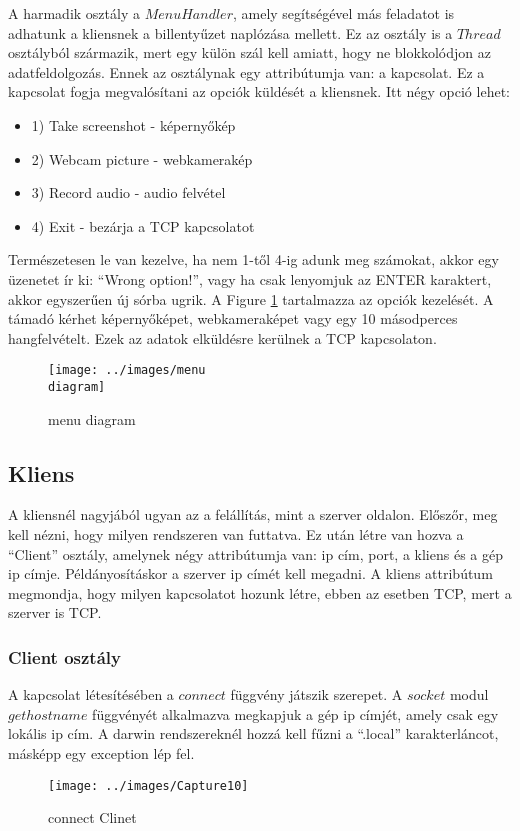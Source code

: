 \documentclass[a4paper, 11pt]{article}
\begin{document}
A harmadik osztály a $MenuHandler$, amely segítségével más feladatot is adhatunk a kliensnek a billentyűzet naplózása mellett. Ez az osztály is a $Thread$ osztályból származik, mert egy külön szál kell amiatt, hogy ne blokkolódjon az adatfeldolgozás. Ennek az osztálynak egy attribútumja van: a kapcsolat. Ez a kapcsolat fogja megvalósítani az opciók küldését a kliensnek. Itt négy opció lehet:
\begin{itemize}
\item 1) Take screenshot - képernyőkép
\item 2) Webcam picture - webkamerakép
\item 3) Record audio - audio felvétel
\item 4) Exit - bezárja a TCP kapcsolatot
\end{itemize}
Természetesen le van kezelve, ha nem 1-től 4-ig adunk meg számokat, akkor egy üzenetet ír ki: ``Wrong option!'', vagy ha csak lenyomjuk az ENTER karaktert, akkor egyszerűen új sórba ugrik. A Figure \ref{fig:menudia} tartalmazza az opciók kezelését. A támadó kérhet képernyőképet, webkameraképet vagy egy 10  másodperces hangfelvételt. Ezek az adatok elküldésre kerülnek a TCP kapcsolaton.
\begin{figure}[H]
\centering
\texttt{[image: ../images/menu\\ diagram]}
\caption{menu diagram}
\label{fig:menudia}
\end{figure}

\subsection{Kliens}\label{subsec:client}
A kliensnél nagyjából ugyan az a felállítás, mint a szerver oldalon. Előszőr, meg kell nézni, hogy milyen rendszeren van futtatva. Ez után létre van hozva a ``Client'' osztály, amelynek négy attribútumja van: ip cím, port, a kliens és a gép ip címje. Példányosításkor a szerver ip címét kell megadni. A kliens attribútum megmondja, hogy milyen kapcsolatot hozunk létre, ebben az esetben TCP, mert a szerver is TCP.

\subsubsection{Client osztály}\label{subsubsec:clinetclass}

A kapcsolat létesítésében a $connect$ függvény játszik szerepet. A $socket$ modul $gethostname$ függvényét alkalmazva megkapjuk a gép ip címjét, amely csak egy lokális ip cím. A darwin rendszereknél hozzá kell fűzni a ``.local'' karakterláncot, másképp egy exception lép fel.
\begin{figure}[H]
\centering
\texttt{[image: ../images/Capture10]}
\caption{connect Clinet}
\label{fig:connectclient}
\end{figure}
\end{document}

